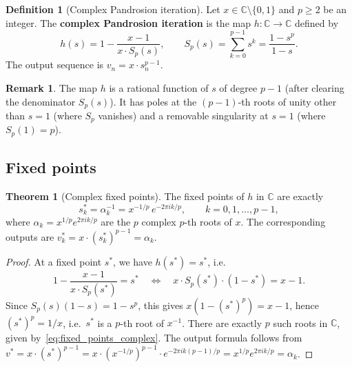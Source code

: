 \documentclass[11pt,a4paper]{article}
\theoremstyle{definition}
\newtheorem{definition}{Definition}[section]
\newtheorem{theorem}{Theorem}[section]
\newtheorem{remark}{Remark}[section]
\newcommand{\CC}{\mathbb{C}}
\begin{document}
\begin{definition}[Complex Pandrosion iteration]
\label{def:complex_pandrosion}
Let $x \in \CC \setminus \{0,1\}$ and $p \geq 2$ be an integer.  The \textbf{complex Pandrosion iteration} is the map $h : \CC \to \CC$ defined by
\begin{equation}
  \label{eq:complex_pandrosion}
  h(s) = 1 - \frac{x-1}{x \cdot S_p(s)},
  \qquad
  S_p(s) = \sum_{k=0}^{p-1} s^k = \frac{1 - s^p}{1 - s}.
\end{equation}
The output sequence is $v_n = x \cdot s_n^{p-1}$.
\end{definition}

\begin{remark}
The map $h$ is a rational function of $s$ of degree $p-1$ (after clearing the denominator $S_p(s)$).  It has poles at the $(p-1)$-th roots of unity other than $s = 1$ (where $S_p$ vanishes) and a removable singularity at $s = 1$ (where $S_p(1) = p$).
\end{remark}

\subsection{Fixed points}

\begin{theorem}[Complex fixed points]
\label{thm:complex_fixed_points}
The fixed points of $h$ in $\CC$ are exactly
\begin{equation}
  \label{eq:fixed_points_complex}
  s_k^* = \alpha_k^{-1} = x^{-1/p}\, e^{-2\pi i k/p},
  \qquad k = 0, 1, \ldots, p-1,
\end{equation}
where $\alpha_k = x^{1/p} e^{2\pi ik/p}$ are the $p$ complex $p$-th roots of $x$.  The corresponding outputs are $v_k^* = x \cdot (s_k^*)^{p-1} = \alpha_k$.
\end{theorem}

\begin{proof}
At a fixed point $s^*$, we have $h(s^*) = s^*$, i.e.\
\[
  1 - \frac{x-1}{x \cdot S_p(s^*)} = s^*
  \quad \Longleftrightarrow \quad
  x \cdot S_p(s^*) \cdot (1 - s^*) = x - 1.
\]
Since $S_p(s)(1-s) = 1 - s^p$, this gives $x(1 - (s^*)^p) = x - 1$, hence $(s^*)^p = 1/x$, i.e.\ $s^*$ is a $p$-th root of $x^{-1}$.  There are exactly $p$ such roots in $\CC$, given by~\eqref{eq:fixed_points_complex}.  The output formula follows from $v^* = x \cdot (s^*)^{p-1} = x \cdot (x^{-1/p})^{p-1} \cdot e^{-2\pi ik(p-1)/p} = x^{1/p} e^{2\pi ik/p} = \alpha_k$.
\end{proof}
\end{document}
